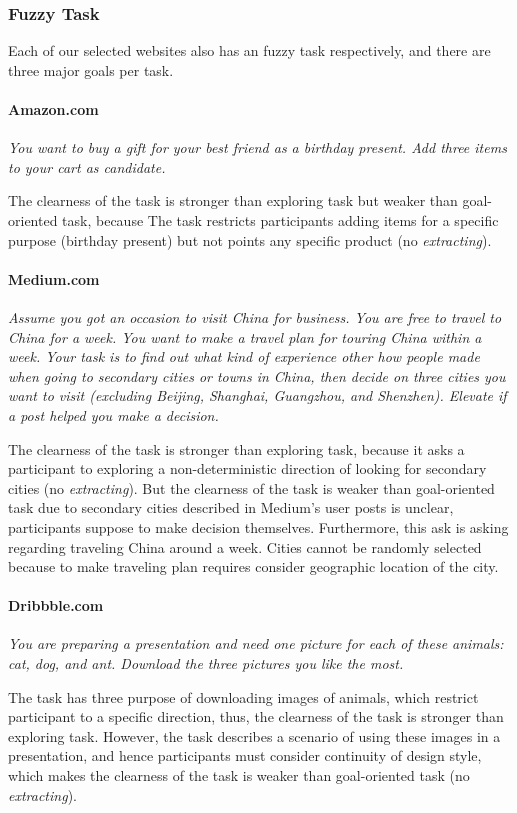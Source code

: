 \subsubsection{Fuzzy Task}

Each of our selected websites also has an fuzzy task respectively, and there are three major goals per task.

\paragraph{Amazon.com} \emph{You want to buy a gift for your best friend as a birthday present.
        Add three items to your cart as candidate.}

The clearness of the task is stronger than exploring task but weaker than goal-oriented task, because
The task restricts participants adding items for a specific purpose (birthday present) but not points
any specific product (no \emph{extracting}).

\paragraph{Medium.com} \emph{Assume you got an occasion to visit China for business. 
        You are free to travel to China for a week. 
        You want to make a travel plan for touring China within a week. Your task is to find out what kind 
        of experience other how people made when going to secondary cities or towns in China, then decide 
        on three cities you want to visit (excluding  Beijing, Shanghai, Guangzhou, and Shenzhen). 
        Elevate if a post helped you make a decision.}

The clearness of the task is stronger than exploring task, because it asks a participant 
to exploring a non-deterministic direction of looking for secondary cities (no \emph{extracting}).
But the clearness of the task is weaker than goal-oriented task due to secondary cities described
in Medium's user posts is unclear, participants suppose to make decision themselves.
Furthermore, this ask is asking regarding traveling China around a week. Cities cannot be randomly
selected because to make traveling plan requires consider geographic location of the city.

\paragraph{Dribbble.com} \emph{You are preparing a presentation and need one picture for each of these animals: 
    cat, dog, and ant. Download the three pictures you like the most.}

The task has three purpose of downloading images of animals, which restrict participant to a specific direction,
thus, the clearness of the task is stronger than exploring task. However, the task describes a scenario of using
these images in a presentation, and hence participants must consider continuity of design style, which makes
the clearness of the task is weaker than goal-oriented task (no \emph{extracting}).

\cleardoublepage